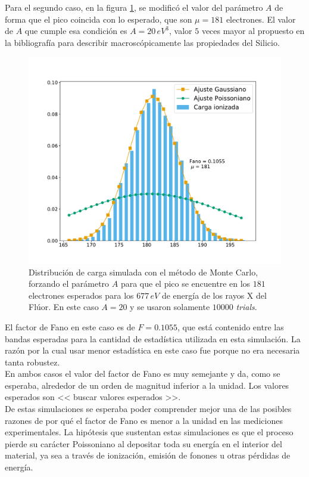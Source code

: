 \noindent Para el segundo caso, en la figura \ref{fig:Simulacion1rden1Fano2}, se modificó el valor del parámetro $A$ de forma que el pico coincida con lo esperado, que son $\mu = 181$ electrones. El valor de $A$ que cumple esa condición es $A = 20\,\si{eV}^{3}$, valor $5$ veces mayor al propuesto en la bibliografía para describir macroscópicamente las propiedades del Silicio.
\begin{figure}%
    \centering
    \includegraphics[scale=0.35]{Figs/Fano_677_Eloss0_10ktrials.pdf}
    \caption{\footnotesize{Distribución de carga simulada con el método de Monte Carlo, forzando el parámetro $A$ para que el pico se encuentre en los $181$ electrones esperados para los $677\,\si{eV}$ de energía de los rayos X del Flúor. En este caso $A=20$ y se usaron solamente $10000$ \textit{trials}.}}
    \label{fig:Simulacion1rden1Fano2}
\end{figure}
El factor de Fano en este caso es de $F = 0.1055$, que está contenido entre las bandas esperadas para la cantidad de estadística utilizada en esta simulación. La razón por la cual usar menor estadística en este caso fue porque no era necesaria tanta robustez.\\
\indent En ambos casos el valor del factor de Fano es muy semejante y da, como se esperaba, alrededor de un orden de magnitud inferior a la unidad. Los valores esperados son << buscar valores esperados >>.\\
\indent De estas simulaciones se esperaba poder comprender mejor una de las posibles razones de por qué el factor de Fano es menor a la unidad en las mediciones experimentales. La hipótesis que sustentan estas simulaciones es que el proceso pierde su carácter Poissoniano al depositar toda su energía en el interior del material, ya sea a través de ionización, emisión de fonones u otras pérdidas de energía.

